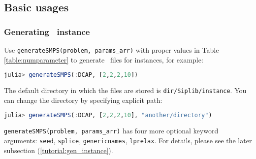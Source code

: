 \subsection{Basic usages}
\subsubsection{Generating \smps\ instance}
Use \texttt{generateSMPS(problem, params\_arr)} with proper values in Table \ref{table:numparameter} to generate \smps\ files for instances, for example:
\begin{lstlisting}[frame=single,language=julia]
julia> generateSMPS(:DCAP, [2,2,2,10])
\end{lstlisting}
The default directory in which the files are stored is \texttt{dir/Siplib/instance}. You can change the directory by specifying explicit path:
\begin{lstlisting}[frame=single,language=julia]
julia> generateSMPS(:DCAP, [2,2,2,10], "another/directory")
\end{lstlisting}
\texttt{generateSMPS(problem, params\_arr)} has four more optional keyword arguments: \texttt{seed},  \texttt{splice}, \texttt{genericnames}, \texttt{lprelax}. For details, please see the later subsection (\ref{tutorial:gen_instance}).

